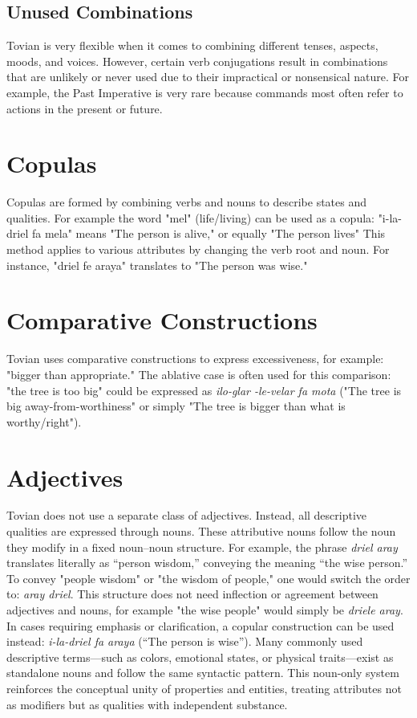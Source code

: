 \subsection{Unused Combinations}
Tovian is very flexible when it comes to combining different tenses, aspects, moods, and voices. However, certain verb conjugations result in combinations that are unlikely or never used due to their impractical or nonsensical nature. For example, the Past Imperative is very rare because commands most often refer to actions in the present or future.



\section{Copulas}
Copulas are formed by combining verbs and nouns to describe states and qualities. For example the word "mel" (life/living) can be used as a copula: "i-la-driel fa mela" means "The person is alive," or equally "The person lives" This method applies to various attributes by changing the verb root and noun. For instance, "driel fe araya" translates to "The person was wise." 

 \section{Comparative Constructions}

    Tovian uses comparative constructions to express excessiveness, for example: "bigger than appropriate." The ablative case is often used for this comparison: "the tree is too big" could be expressed as \textit{ilo-glar \CAabl-le-velar fa mota} ("The tree is big away-from-worthiness" or simply "The tree is bigger than what is worthy/right").

\section{Adjectives}

Tovian does not use a separate class of adjectives. Instead, all descriptive qualities are expressed through nouns. These attributive nouns follow the noun they modify in a fixed noun–noun structure. For example, the phrase \textit{driel aray} translates literally as “person wisdom,” conveying the meaning “the wise person.” To convey "people wisdom" or "the wisdom of people," one would switch the order to: \textit{aray driel}. This structure does not need inflection or agreement between adjectives and nouns, for example "the wise people" would simply be \textit{driele aray}. In cases requiring emphasis or clarification, a copular construction can be used instead: \textit{i-la-driel fa araya} (“The person is wise”). Many commonly used descriptive terms—such as colors, emotional states, or physical traits—exist as standalone nouns and follow the same syntactic pattern. This noun-only system reinforces the conceptual unity of properties and entities, treating attributes not as modifiers but as qualities with independent substance.


